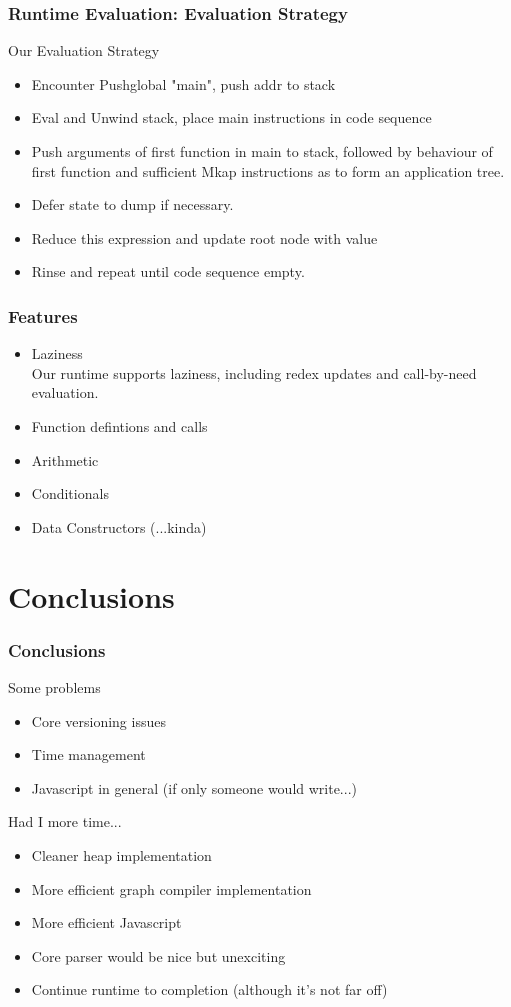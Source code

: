 \documentclass{beamer}
\begin{document}
\begin{frame}[fragile]
	\frametitle{Runtime Evaluation: Evaluation Strategy}
	Our Evaluation Strategy
	\begin{itemize}
		\item Encounter Pushglobal "main", push addr to stack
		\item Eval and Unwind stack, place main instructions in 
		code sequence
		\item Push arguments of first function in main to stack,
		followed by behaviour of first function and sufficient 
		Mkap instructions as to form an application tree.
		\item Defer state to dump if necessary.
		\item Reduce this expression and update root node with 
		value
		\item Rinse and repeat until code sequence empty. 
	\end{itemize}
\end{frame}

\begin{frame}
	\frametitle{Features}
	\begin{itemize}
		\item Laziness \\
		Our runtime supports laziness, including redex updates
		and call-by-need evaluation. 
		\item Function defintions and calls
		\item Arithmetic 
		\item Conditionals
		\item Data Constructors (...kinda)
	\end{itemize}
		
\end{frame}

\section{Conclusions}

\begin{frame}
	\frametitle{Conclusions}
	Some problems
	\begin{itemize}
		\item Core versioning issues
		\item Time management
		\item Javascript in general (if only someone would
		      write...)
	\end{itemize}	
	Had I more time...
	\begin{itemize}
		\item Cleaner heap implementation
		\item More efficient graph compiler implementation
		\item More efficient Javascript
		\item Core parser would be nice but unexciting
		\item Continue runtime to completion (although it's not
			  far off)
	\end{itemize}
	
\end{frame}
\end{document}
